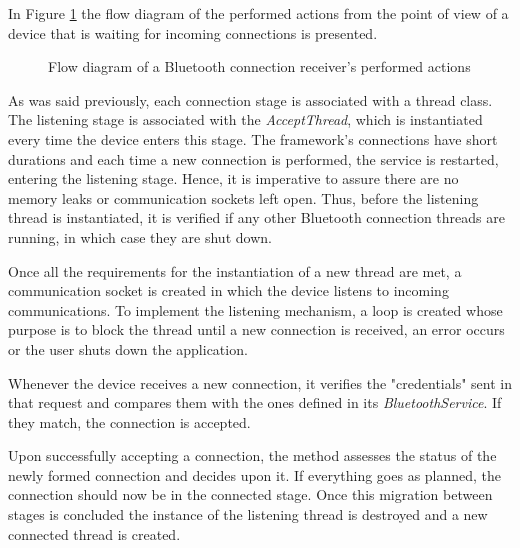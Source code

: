In Figure \ref{fig:btreceiver} the flow diagram of the performed actions from the point of view of a device that is waiting for incoming connections is presented.

\begin{figure}[ht]
	\noindent{}
	\caption{\label{fig:btreceiver} Flow diagram of a Bluetooth connection receiver's performed actions}
\end{figure}

As was said previously, each connection stage is associated with a thread class. The listening stage is associated with the \textit{AcceptThread}, which is instantiated every time the device enters this stage. The framework's connections have short durations and each time a new connection is performed, the service is restarted, entering the listening stage. Hence, it is imperative to assure there are no memory leaks or communication sockets left open. Thus, before the listening thread is instantiated, it is verified if any other Bluetooth connection threads are running, in which case they are shut down.

Once all the requirements for the instantiation of a new thread are met, a communication socket is created in which the device listens to incoming communications. To implement the listening mechanism, a loop is created whose purpose is to block the thread until a new connection is received, an error occurs or the user shuts down the application.

Whenever the device receives a new connection, it verifies the "credentials" sent in that request and compares them with the ones defined in its \textit{BluetoothService}. If they match, the connection is accepted.

Upon successfully accepting a connection, the method assesses the status of the newly formed connection and decides upon it. If everything goes as planned, the connection should now be in the connected stage. Once this migration between stages is concluded the instance of the listening thread is destroyed and a new connected thread is created.

